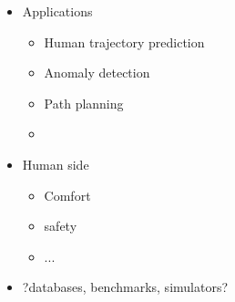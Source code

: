 \begin{itemize}
    \item Applications
        \begin{itemize}
            \item Human trajectory prediction
            \item Anomaly detection
            \item Path planning
            \item 
        \end{itemize}

    \item Human side
    \begin{itemize}
        \item Comfort
        \item safety
        \item ...
    \end{itemize}

    \item ?databases, benchmarks, simulators?
\end{itemize}